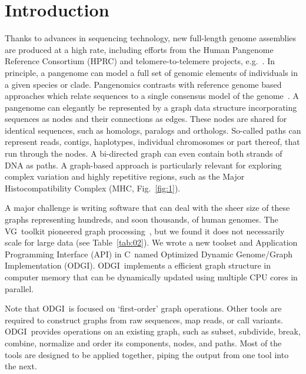 \documentclass{bioinfo}
\newcommand{\odgi}{ODGI}
\newcommand{\vg}{VG}
\newcommand{\Rplus}{\protect\hspace{-.1em}\protect\raisebox{.35ex}{\smaller{\smaller\textbf{+}}}}
\newcommand{\Cpp}{\mbox{C\Rplus\Rplus}\xspace}
\begin{document}
    \section{Introduction}

    Thanks to advances in sequencing technology, new full-length
    genome assemblies are produced at a high rate, including efforts
    from the Human Pangenome Reference Consortium (HPRC) and
    telomere-to-telemere projects, e.g.~\citep{Miga:2020, Logsdon:2021}. In
    principle, a pangenome can model a full set of genomic elements of
    individuals in a given species or clade. Pangenomics contrasts
    with reference genome based approaches which relate sequences to a
    single consensus model of the genome~\citep{Eizenga:2020}. A
    pangenome can elegantly be represented by a graph data structure
    incorporating sequences as nodes and their connections as
    edges. These nodes are shared for identical sequences, such as
    homologs, paralogs and orthologs. So-called paths can represent
    reads, contigs, haplotypes, individual chromosomes or part
    thereof, that run through the nodes. A bi-directed graph can even
    contain both strands of DNA as paths. A graph-based approach is
    particularly relevant for exploring complex variation and highly
    repetitive regions, such as the Major Histocompatibility Complex
    (MHC, Fig.~\ref{fig:1}).

    A major challenge is writing software that can deal with the sheer
    size of these graphs representing hundreds, and soon thousands, of
    human genomes. The \vg\ toolkit pioneered graph
    processing~\citep{vgtools,Eizenga:2020b}, but we found it does not
    necessarily scale for large data (see Table~\ref{tab:02}). We
    wrote a new toolset and Application Programming Interface (API) in
    \Cpp\ named Optimized Dynamic Genome/Graph Implementation (ODGI).
    \odgi\ implements a efficient graph structure in computer memory
    that can be dynamically updated using multiple CPU cores in
    parallel.

    Note that \odgi\ is focused on `first-order' graph
    operations. Other tools are required to construct graphs from raw
    sequences, map reads, or call variants. \odgi\ provides
    operations on an existing graph, such as subset, subdivide, break,
    combine, normalize and order its components, nodes, and
    paths. Most of the tools are designed to be applied together,
    piping the output from one tool into the next.


    
\end{document}

